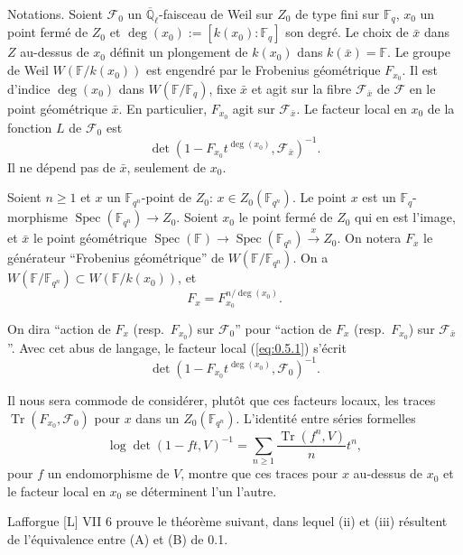 \documentclass[10pt,a4paper]{article}
\theoremstyle{plain}
\theoremstyle{definition}
\DeclareMathOperator{\Spec}{Spec}
\DeclareMathOperator{\tr}{Tr}
\begin{document}
Notations. Soient $\mathcal{F}_0$ un $\overline{\mathbb{Q}}_\ell$-faisceau de Weil sur $Z_0$ de type fini sur $\mathbb{F}_q$, $x_0$ un point ferm\'e de $Z_0$ et $\deg(x_0) := [k(x_0):\mathbb{F}_q]$ son degr\'e. Le choix de $\bar{x}$ dans $Z$ au-dessus de $x_0$ d\'efinit un plongement de $k(x_0)$ dans $k(\bar{x}) = \mathbb{F}$. Le groupe de Weil $W(\mathbb{F}/k(x_0))$ est engendr\'e par le Frobenius g\'eom\'etrique $F_{x_0}$. Il est d'indice $\deg(x_0)$ dans $W(\mathbb{F}/\mathbb{F}_q)$, fixe $\bar{x}$ et agit sur la fibre $\mathcal{F}_{\bar{x}}$ de $\mathcal{F}$ en le point g\'eom\'etrique $\bar{x}$. En particulier, $F_{x_0}$ agit sur $\mathcal{F}_{\bar{x}}$. Le facteur local en $x_0$ de la fonction $L$ de $\mathcal{F}_0$ est
\begin{equation}\label{eq:0.5.1}
\det(1 - F_{x_0}t^{\deg(x_0)}, \mathcal{F}_{\bar{x}})^{-1}.
\end{equation}
Il ne d\'epend pas de $\bar{x}$, seulement de $x_0$.

Soient $n \geq 1$ et $x$ un $\mathbb{F}_{q^n}$-point de $Z_0$: $x \in Z_0(\mathbb{F}_{q^n})$. Le point $x$ est un $\mathbb{F}_q$-morphisme $\Spec(\mathbb{F}_{q^n}) \to Z_0$. Soient $x_0$ le point ferm\'e de $Z_0$ qui en est l'image, et $\bar{x}$ le point g\'eom\'etrique $\Spec(\mathbb{F}) \to \Spec(\mathbb{F}_{q^n}) \xrightarrow{x} Z_0$. On notera $F_x$ le g\'en\'erateur ``Frobenius g\'eom\'etrique'' de $W(\mathbb{F}/\mathbb{F}_{q^n})$. On a $W(\mathbb{F}/\mathbb{F}_{q^n}) \subset W(\mathbb{F}/k(x_0))$, et
\begin{equation}\label{eq:0.5.2}
F_x = F_{x_0}^{n/\deg(x_0)}.
\end{equation}

On dira ``action de $F_x$ (resp.~$F_{x_0}$) sur $\mathcal{F}_0$'' pour ``action de $F_x$ (resp.~$F_{x_0}$) sur $\mathcal{F}_{\bar{x}}$''. Avec cet abus de langage, le facteur local (\ref{eq:0.5.1}) s'\'ecrit
\[
\det(1 - F_{x_0}t^{\deg(x_0)}, \mathcal{F}_0)^{-1}.
\]

Il nous sera commode de consid\'erer, plut\^ot que ces facteurs locaux, les traces $\tr(F_{x_0},\mathcal{F}_0)$ pour $x$ dans un $Z_0(\mathbb{F}_{q^n})$. L'identit\'e entre s\'eries formelles
\[
\log \det(1 - ft, V)^{-1} = \sum_{n \geq 1} \frac{\tr(f^n,V)}{n} t^n,
\]
pour $f$ un endomorphisme de $V$, montre que ces traces pour $x$ au-dessus de $x_0$ et le facteur local en $x_0$ se d\'eterminent l'un l'autre.

Lafforgue [L] VII 6 prouve le th\'eor\`eme suivant, dans lequel (ii) et (iii) r\'esultent de l'\'equivalence entre (A) et (B) de 0.1.
\end{document}
